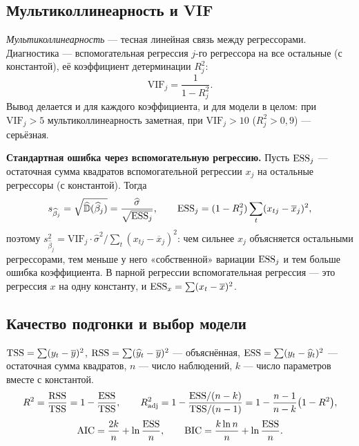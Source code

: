 \subsection{Мультиколлинеарность и VIF}\label{sec:vif}

\emph{Мультиколлинеарность} — тесная линейная связь между регрессорами.
Диагностика — вспомогательная регрессия $j$-го регрессора на все остальные
(с константой), её коэффициент детерминации $R_j^2$:
\begin{equation}
  \mathrm{VIF}_j = \frac{1}{1 - R_j^2}.
  \label{eq:vif}
\end{equation}
Вывод делается и для каждого коэффициента, и для модели в целом: при
$\mathrm{VIF}_j > 5$ мультиколлинеарность заметная, при $\mathrm{VIF}_j > 10$
($R_j^2 > 0{,}9$) — серьёзная.

\textbf{Стандартная ошибка через вспомогательную регрессию.} Пусть
$\mathrm{ESS}_j$ — остаточная сумма квадратов вспомогательной регрессии $x_j$ на
остальные регрессоры (с константой). Тогда
\begin{equation}
  s_{\widehat{\beta}_j} = \sqrt{\widehat{\mathbb{D}}(\widehat{\beta}_j)}
  = \frac{\widehat{\sigma}}{\sqrt{\mathrm{ESS}_j}},
  \qquad
  \mathrm{ESS}_j = (1 - R_j^2)\sum_t(x_{tj} - \overline{x}_j)^2,
  \label{eq:se}
\end{equation}
поэтому
$s^2_{\widehat{\beta}_j} = \mathrm{VIF}_j\cdot\widehat{\sigma}^2/\sum_t(x_{tj} - \overline{x}_j)^2$:
чем сильнее $x_j$ объясняется остальными регрессорами, тем меньше у него
«собственной» вариации $\mathrm{ESS}_j$ и тем больше ошибка коэффициента. В парной
регрессии вспомогательная регрессия — это регрессия $x$ на одну константу, и
$\mathrm{ESS}_x = \sum(x_t - \overline{x})^2$.

\subsection{Качество подгонки и выбор модели}\label{sec:fit}

$\mathrm{TSS} = \sum(y_t - \overline{y})^2$, $\mathrm{RSS} = \sum(\widehat{y}_t - \overline{y})^2$
— объяснённая, $\mathrm{ESS} = \sum(y_t - \widehat{y}_t)^2$ — остаточная сумма
квадратов, $n$ — число наблюдений, $k$ — число параметров вместе с
константой.
\begin{gather}
  R^2 = \frac{\mathrm{RSS}}{\mathrm{TSS}} = 1 - \frac{\mathrm{ESS}}{\mathrm{TSS}},
  \qquad
  R^2_{\text{adj}} = 1 - \frac{\mathrm{ESS}/(n-k)}{\mathrm{TSS}/(n-1)}
                   = 1 - \frac{n-1}{n-k}\bigl(1 - R^2\bigr),
  \label{eq:r2} \\[2pt]
  \mathrm{AIC} = \frac{2k}{n} + \ln\frac{\mathrm{ESS}}{n},
  \qquad
  \mathrm{BIC} = \frac{k\ln n}{n} + \ln\frac{\mathrm{ESS}}{n}.
  \label{eq:ic}
\end{gather}

